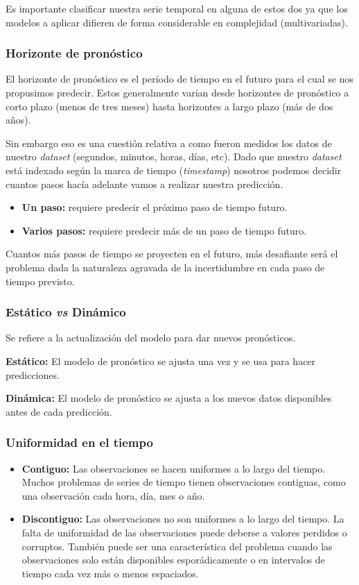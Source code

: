 \documentclass[a4paper,12pt]{article}
\begin{document}
Es importante clasificar nuestra serie temporal en alguna de estos dos ya que los modelos a aplicar difieren de forma considerable en complejidad (multivariadas).

\subsubsection{Horizonte de pronóstico}

El horizonte de pronóstico es el período de tiempo en el futuro para el cual se nos propusimos predecir. Estos generalmente varían desde horizontes de pronóstico a corto plazo (menos de tres meses) hasta horizontes a largo plazo (más de dos años).

Sin embargo eso es una cuestión relativa a como fueron medidos los datos de nuestro \textit{dataset} (segundos, minutos, horas, días, etc). Dado que nuestro \textit{dataset} está indexado según la marca de tiempo (\textit{timestamp}) nosotros podemos decidir cuantos pasos hacía adelante vamos a realizar nuestra predicción.

\begin{itemize}
	\item \textbf{Un paso:} requiere predecir el próximo paso de tiempo futuro.
	\item \textbf{Varios pasos:} requiere predecir más de un paso de tiempo futuro.
\end{itemize}

Cuantos más pasos de tiempo se proyecten en el futuro, más desafiante será el problema dada la naturaleza agravada de la incertidumbre en cada paso de tiempo previsto.

\subsubsection{Estático \textit{vs} Dinámico}
Se refiere a la actualización del modelo para dar nuevos pronósticos.

\textbf{Estático:} El modelo de pronóstico se ajusta una vez y se usa para hacer predicciones.

\textbf{Dinámica:} El modelo de pronóstico se ajusta a los nuevos datos disponibles antes de cada predicción.

\subsubsection{Uniformidad en el tiempo}

\begin{itemize}
	\item \textbf{Contiguo:} Las observaciones se hacen uniformes a lo largo del tiempo. Muchos problemas de series de tiempo tienen observaciones contiguas, como una observación cada hora, día, mes o año.
	\item \textbf{Discontiguo:} Las observaciones no son uniformes a lo largo del tiempo. La falta de uniformidad de las observaciones puede deberse a valores perdidos o corruptos. También puede ser una característica del problema cuando las observaciones solo están disponibles esporádicamente o en intervalos de tiempo cada vez más o menos espaciados.
\end{itemize}
\end{document}
